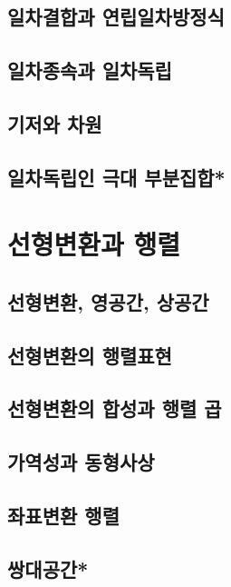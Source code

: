 \documentclass{oblivoir}
\begin{document}
\subsection{일차결합과 연립일차방정식}
\subsection{일차종속과 일차독립}
\subsection{기저와 차원}
\subsection{일차독립인 극대 부분집합*}

\newpage
\section{선형변환과 행렬}
\subsection{선형변환, 영공간, 상공간}
\subsection{선형변환의 행렬표현}
\subsection{선형변환의 합성과 행렬 곱}
\subsection{가역성과 동형사상}
\subsection{좌표변환 행렬}
\subsection{쌍대공간*}
\end{document}
